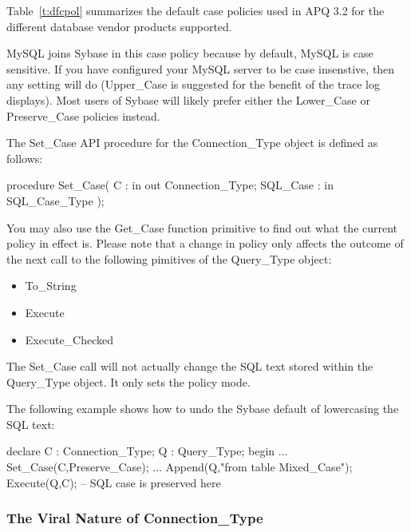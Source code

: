 \documentclass[english,letterpaper]{book}
\newcommand\apqversion{3.2}
\begin{document}
Table~\ref{t:dfcpol} summarizes the default case policies used in APQ \apqversion
for the different database vendor products supported.

MySQL joins Sybase in this case policy because by default, MySQL is
case sensitive. If you have configured your MySQL server to be case
insenstive, then any setting will do (Upper\_Case is suggested for
the benefit of the trace log displays). Most users of Sybase will
likely prefer either the Lower\_Case or Preserve\_Case
policies instead.

The Set\_Case API procedure for the Connection\_Type object is defined
as follows:

\begin{Code}
procedure Set_Case(
   C :        in out Connection_Type;
   SQL_Case : in     SQL_Case_Type
);
\end{Code}

You may also use the Get\_Case function primitive to find out what
the current policy in effect is. Please note that a change in policy
only affects the outcome of the next call to the following
pimitives of the Query\_Type object:

\begin{itemize}
   \item To\_String
   \item Execute
   \item Execute\_Checked
\end{itemize}

The Set\_Case call will not actually change the SQL text stored within
the Query\_Type object. It only sets the policy mode.

The following example shows how to undo the Sybase default of lowercasing
the SQL text:

\begin{Example}
declare
   C : Connection_Type;
   Q : Query_Type;
begin
   ...
   Set_Case(C,Preserve_Case);
   ...
   Append(Q,"from table Mixed_Case");
   Execute(Q,C); -- SQL case is preserved here
\end{Example}

\subsubsection{The Viral Nature of Connection\_Type}
\end{document}
